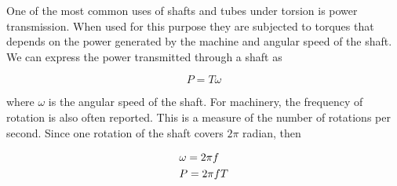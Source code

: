 \documentclass[
10pt,
a4paper,
openany,
svgnames,
]{kaobook} %
\begin{document}
One of the most common uses of shafts and tubes under torsion is power transmission. When used for this purpose they are subjected to torques that depends on the power generated by the machine and angular speed of the shaft. We can express the power transmitted through a shaft as

\begin{equation}
  P = T\omega
\end{equation}

where $\omega$  is the angular speed of the shaft. For machinery, the frequency of rotation is also often reported. This is a measure of the number of rotations per second. Since one rotation of the shaft covers $2\pi$ radian, then

\begin{equation} \label{eqn: power-torque}
  \begin{gathered}
    \omega  = 2\pi f \hfill \\
    P = 2\pi fT \hfill \\ 
  \end{gathered}
\end{equation}
\end{document}
